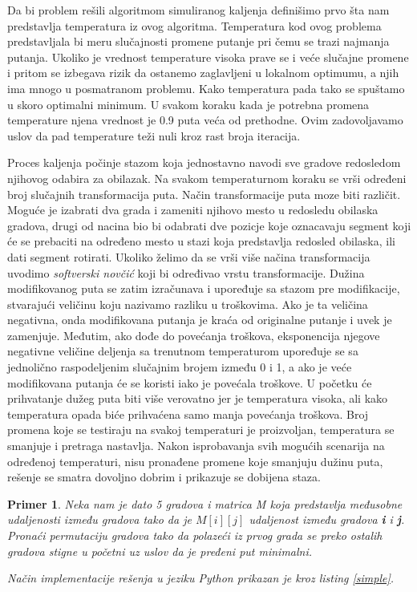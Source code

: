 \documentclass[a4paper]{article}
\newtheorem{primer}{Primer}[section]
\begin{document}
Da bi problem rešili algoritmom simuliranog kaljenja definišimo prvo šta nam predstavlja temperatura iz ovog algoritma. Temperatura kod ovog problema predstavljala bi meru slučajnosti promene putanje pri čemu se trazi najmanja putanja. Ukoliko je vrednost temperature visoka prave se i veće slučajne promene i pritom se izbegava rizik da ostanemo zaglavljeni u lokalnom optimumu, a njih ima mnogo u posmatranom problemu. Kako temperatura pada tako se spuštamo u skoro optimalni minimum. U svakom koraku kada je potrebna promena temperature njena vrednost je 0.9 puta veća od prethodne. Ovim zadovoljavamo uslov da pad temperature teži nuli kroz rast broja iteracija.\par

Proces kaljenja počinje stazom koja jednostavno navodi sve gradove redosledom njihovog odabira za obilazak. Na svakom temperaturnom koraku se vrši određeni broj slučajnih transformacija puta. Način transformacije puta moze biti različit. Moguće je izabrati dva grada i zameniti njihovo mesto u redosledu obilaska gradova, drugi od nacina bio bi odabrati dve pozicje koje oznacavaju segment koji će se prebaciti na određeno mesto u stazi koja predstavlja redosled obilaska, ili dati segment rotirati. Ukoliko želimo da se vrši više načina transformacija uvodimo \emph{softverski novčić} koji bi određivao vrstu transformacije. 
 Dužina modifikovanog puta se zatim izračunava i upoređuje sa stazom pre modifikacije, stvarajući veličinu koju nazivamo razliku u troškovima. Ako je ta veličina negativna, onda modifikovana putanja je kraća od originalne putanje i uvek je zamenjuje. Međutim, ako dođe do povećanja troškova, eksponencija njegove negativne veličine deljenja sa trenutnom temperaturom upoređuje se sa jednolično raspodeljenim slučajnim brojem između 0 i 1, a ako je veće modifikovana putanja će se koristi iako je povećala troškove. U početku će prihvatanje dužeg puta biti više verovatno jer je temperatura visoka, ali kako temperatura opada biće prihvaćena samo manja povećanja troškova. Broj promena koje se testiraju na svakoj temperaturi je proizvoljan, temperatura se smanjuje i pretraga nastavlja. Nakon isprobavanja svih mogućih scenarija na određenoj temperaturi, nisu pronađene promene koje smanjuju dužinu puta, rešenje se smatra dovoljno dobrim i prikazuje se dobijena staza.

\begin{primer}
Neka nam je dato 5 gradova i matrica M koja predstavlja međusobne udaljenosti između gradova tako da je $M[i][j]$ udaljenost između gradova \textbf{i} i \textbf{j}. Pronaći permutaciju gradova tako da polazeći iz prvog grada se preko ostalih gradova stigne u početni uz uslov da je pređeni put minimalni.\par
Način implementacije rešenja u jeziku Python prikazan je kroz listing \ref{simple}. 
\end{primer}
\end{document}
